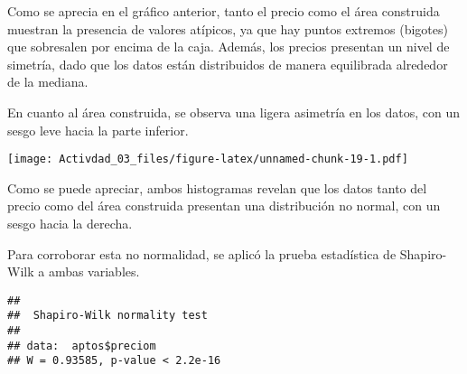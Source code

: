 \documentclass[
]{article}
\newenvironment{Shaded}{\begin{snugshade}}{\end{snugshade}}
\newcommand{\AttributeTok}[1]{\textcolor[rgb]{0.13,0.29,0.53}{#1}}
\newcommand{\CommentTok}[1]{\textcolor[rgb]{0.56,0.35,0.01}{\textit{#1}}}
\newcommand{\DecValTok}[1]{\textcolor[rgb]{0.00,0.00,0.81}{#1}}
\newcommand{\FunctionTok}[1]{\textcolor[rgb]{0.13,0.29,0.53}{\textbf{#1}}}
\newcommand{\NormalTok}[1]{#1}
\newcommand{\SpecialCharTok}[1]{\textcolor[rgb]{0.81,0.36,0.00}{\textbf{#1}}}
\newcommand{\StringTok}[1]{\textcolor[rgb]{0.31,0.60,0.02}{#1}}
\begin{document}
Como se aprecia en el gráfico anterior, tanto el precio como el área
construida muestran la presencia de valores atípicos, ya que hay puntos
extremos (bigotes) que sobresalen por encima de la caja. Además, los
precios presentan un nivel de simetría, dado que los datos están
distribuidos de manera equilibrada alrededor de la mediana.

En cuanto al área construida, se observa una ligera asimetría en los
datos, con un sesgo leve hacia la parte inferior.

\begin{Shaded}
\end{Shaded}

\texttt{[image: Activdad\_03\_files/figure-latex/unnamed-chunk-19-1.pdf]}

Como se puede apreciar, ambos histogramas revelan que los datos tanto
del precio como del área construida presentan una distribución no
normal, con un sesgo hacia la derecha.

Para corroborar esta no normalidad, se aplicó la prueba estadística de
Shapiro-Wilk a ambas variables.

\begin{Shaded}
\end{Shaded}

\begin{verbatim}
## 
##  Shapiro-Wilk normality test
## 
## data:  aptos$preciom
## W = 0.93585, p-value < 2.2e-16
\end{verbatim}
\end{document}
